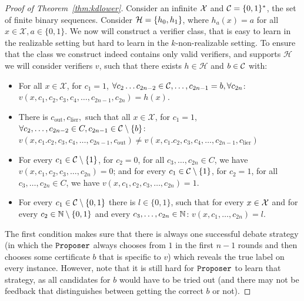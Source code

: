 \documentclass[11pt,letterpaper]{article}
\theoremstyle{definition}
\theoremstyle{plain}
\begin{document}
\begin{proof}[Proof of Theorem~\ref{thm:kdlower}]
    Consider an infinite ${\mathcal X}$ and ${{\mathcal C}} = \{0,1\}^*$, the set of finite binary sequences.  Consider ${{\mathcal H}} = \{h_0,h_1\}$, where $h_a(x) = a$ for all $x\in \mathcal{X}, a\in\{0,1\}$. 
    We now will construct a verifier class, that is easy to learn in the realizable setting but hard to learn in the $k$-non-realizable setting.
  To ensure that the class we construct indeed contains only valid  verifiers, and supports $\mathcal{H}$ we will consider verifiers $v$, such that there exists $h\in \mathcal{H}$ and $b\in {{\mathcal C}}$ with:
  \begin{itemize}
      \item For all $x \in \mathcal{X}$, for $c_1 =1$, $\forall c_2 \dots c_{2n-2}\in {{\mathcal C}}, \dots, c_{2n-1}= b, \forall c_{2n}  $: $v(x, c_1, c_2, c_3,c_4, \dots, c_{2n-1}, c_{2n}) = h(x) $.
      \item There is $c_{\mathrm{out}},c_{\mathrm{lier}}, $ such that all $x \in \mathcal{X}$, for $c_1 =1$, $\forall c_2, \dots, c_{2n-2} \in C,  c_{2n-1} \in {{\mathcal C}} \setminus \{b\}$: $v(x, c_1. c_2, c_3,c_4, \dots, c_{2n-1}, c_{\mathrm{out}}) \neq v(x, c_1. c_2, c_3,c_4, \dots, c_{2n-1}, c_{\mathrm{lier}}) $%
      \item For every $c_1 \in {{\mathcal C}} \setminus \{1\}$, for $c_2 = 0 $, for all $c_3, \dots, c_{2n} \in C$, we have $v(x,c_1, c_2, c_3, \dots, c_{2n}) = 0$; and for every $c_1 \in {{\mathcal C}} \setminus \{1\}$, for $c_2 = 1 $, for all $c_3, \dots, c_{2n} \in C$, we have $v(x,c_1, c_2, c_3, \dots, c_{2n}) = 1$. 
      \item For every $c_1\in {{\mathcal C}} \setminus \{0,1\}$ there is $l \in \{0,1\}$, such that for every $x\in{\mathcal X}$ and for every $c_2\in \mathbb{N} \setminus \{0,1\}$ and every $c_3, \dots, c_{2n} \in \mathbb{N}$: $v(x,c_1, \dots, c_{2n})= l $.
  \end{itemize}
    The first condition makes sure that there is always one successful debate strategy (in which the $\texttt{Proposer}$ always chooses from $1$ in the first $n-1$ rounds and then chooses some certificate $b$ that is specific to $v$) which reveals the true label on every instance. 
    However, note that it is still hard for $\texttt{Proposer}$ to learn that strategy, as all candidates for $b$ would have to be tried out (and there may not be feedback that distinguishes between getting the correct $b$ or not). 
    

\end{proof}
\end{document}
